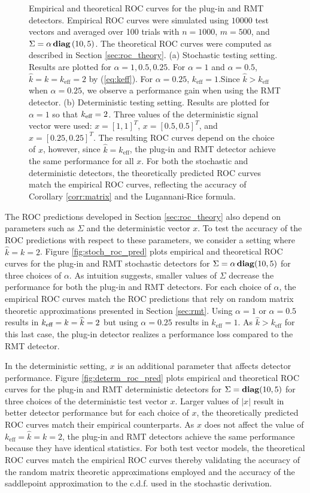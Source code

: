 \begin{figure}
\caption{Empirical and theoretical ROC curves for the plug-in and RMT detectors. Empirical ROC curves were simulated using $10000$ test vectors and averaged over 100 trials with $n=1000$, $m=500$, and $\Sigma =\alpha\mathop{\bf diag}\left(10,5\right)$. The theoretical ROC curves were computed as described in Section \ref{sec:roc_theory}. (a) Stochastic testing setting. Results are plotted for $\alpha=1,0.5,0.25$. For $\alpha=1$ and $\alpha=0.5$, $\widehat{k}=k=k_\text{eff}=2$ by (\ref{eq:keff}). For $\alpha=0.25$, $k_\text{eff}=1$.Since $\widehat{k} > k_{\text{eff}}$ when $\alpha=0.25$, we observe a performance gain when using the RMT detector. (b) Deterministic testing setting. Results are plotted for $\alpha=1$ so that $k_\text{eff}=2$. Three values of the deterministic signal vector were used: $x=[1,1]^T$, $x=[0.5,0.5]^T$, and $x=[0.25,0.25]^T$. The resulting ROC curves depend on the choice of $x$, however, since $\widehat{k} = k_{\text{eff}}$, the plug-in and RMT detector achieve the same performance for all $x$. For both the stochastic and deterministic detectors, the theoretically predicted ROC curves match the empirical ROC curves, reflecting the accuracy of Corollary \ref{corr:matrix} and the Lugannani-Rice formula.}
\vspace{-0.3in}
\end{figure}

The ROC predictions developed in Section \ref{sec:roc_theory} also depend on parameters such as $\Sigma$ and the deterministic vector $x$. To test the accuracy of the ROC predictions with respect to these parameters, we consider a setting where $\widehat{k}=k = 2$. Figure \ref{fig:stoch_roc_pred} plots empirical and theoretical ROC curves for the plug-in and RMT stochastic detectors for $\Sigma=\alpha\mathop{\bf diag}(10,5)$ for three choices of $\alpha$. As intuition suggests, smaller values of $\Sigma$ decrease the performance for both the plug-in and RMT detectors. For each choice of $\alpha$, the empirical ROC curves match the ROC predictions that rely on random matrix theoretic approximations presented in Section \ref{sec:rmt}. Using $\alpha=1$ or $\alpha=0.5$ results in $k_\text{eff}=k=\widehat{k}=2$ but using $\alpha=0.25$ results in $k_\text{eff}=1$. As $\widehat{k}>k_\text{eff}$ for this last case, the plug-in detector realizes a performance loss compared to the RMT detector.

In the deterministic setting, $x$ is an additional parameter that affects detector performance. Figure \ref{fig:determ_roc_pred} plots empirical and theoretical ROC curves for the plug-in and RMT deterministic detectors for $\Sigma=\mathop{\bf diag}(10,5)$ for three choices of the deterministic test vector $x$. Larger values of $|x|$ result in better detector performance but for each choice of $x$, the theoretically predicted ROC curves match their empirical counterparts. As $x$ does not affect the value of $k_\text{eff}=\widehat{k}=k=2$, the plug-in and RMT detectors achieve the same performance because they have identical statistics. For both test vector models, the theoretical ROC curves match the empirical ROC curves thereby validating the accuracy of the random matrix theoretic approximations employed and the accuracy of the saddlepoint approximation to the c.d.f. used in the stochastic derivation. 

